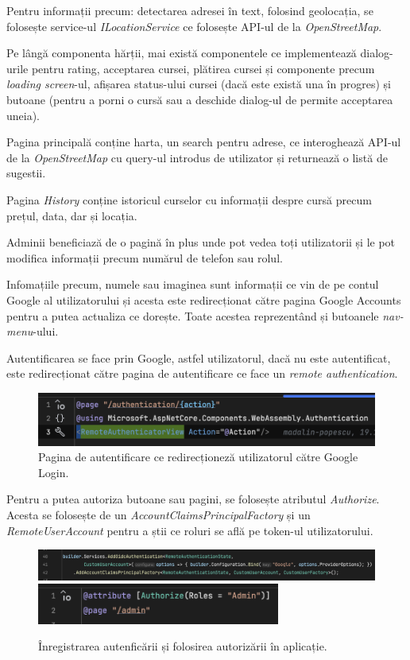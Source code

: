 Pentru informații precum: detectarea adresei în text, folosind geolocația, se folosește service-ul
\textit{ILocationService} ce folosește API-ul de la \textit{OpenStreetMap}.

Pe lângă componenta hărții, mai există componentele ce implementează dialog-urile pentru
rating, acceptarea cursei, plătirea cursei și componente precum \textit{loading screen}-ul,
afișarea status-ului cursei (dacă este există una în progres) și butoane (pentru a porni o cursă sau a deschide dialog-ul de permite acceptarea uneia).

Pagina principală conține harta, un search pentru adrese, ce interoghează API-ul de la \textit{OpenStreetMap}
cu query-ul introdus de utilizator și returnează o listă de sugestii.

Pagina \textit{History} conține
istoricul curselor cu informații despre cursă precum prețul, data, dar și locația.

Adminii beneficiază de o pagină în plus
unde pot vedea toți utilizatorii și le pot modifica informații precum numărul de telefon sau rolul.

Infomațiile precum, numele sau imaginea sunt informații ce vin de pe contul Google al utilizatorului și acesta
este redirecționat către pagina Google Accounts pentru a putea actualiza ce dorește. Toate acestea reprezentând și butoanele \textit{nav-menu}-ului.

Autentificarea se face prin Google, astfel utilizatorul, dacă nu este autentificat, este redirecționat către
pagina de autentificare ce face un \textit{remote authentication}.

\begin{figure}[H]
    \centering
    \includegraphics[width=14cm]{Assets/authenticationRemote.png}
    \caption{Pagina de autentificare ce redirecționeză utilizatorul către Google Login.}
    \label{fig:authenticationRemote}
\end{figure}

Pentru a putea autoriza butoane sau pagini, se folosește atributul \textit{Authorize}. Acesta se folosește de
un \textit{AccountClaimsPrincipalFactory} și un \textit{RemoteUserAccount} pentru a știi ce roluri se află pe token-ul utilizatorului.

\begin{figure}[H]
    \centering
    \includegraphics[width=16cm]{Assets/registerAuthentication.png}
    \includegraphics[width=8cm]{Assets/authorizeAttribute.png}
    \caption{Înregistrarea autenficării și folosirea autorizării în aplicație.}
    \label{fig:registerUseAuth}
\end{figure}

